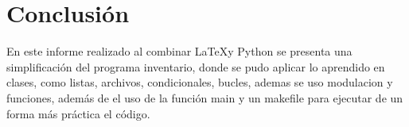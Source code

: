 \documentclass[12pt]{article}
\begin{document}
\section{Conclusión}

En este informe realizado al combinar \LaTeX y Python se presenta una simplificación del programa inventario, donde se pudo aplicar lo aprendido en clases, como listas, archivos,  condicionales, bucles, ademas se uso modulacion y funciones, además de el uso de la función main y un makefile para ejecutar de un forma más práctica el código.
\end{document}
